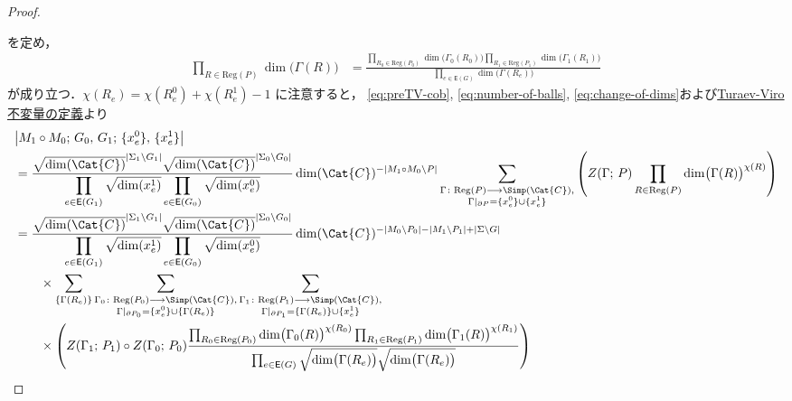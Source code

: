 \documentclass[TQFT_main]{subfiles}
\begin{document}
\begin{proof}
\begin{itemize}
    \end{itemize}
    を定め，
    \begin{align}
        \prod_{R \in \mathrm{Reg}(P)} \dim \bigl( \Gamma(R) \bigr) 
        &= \frac{\displaystyle\prod_{R_0 \in \mathrm{Reg}(P_0)} \dim \bigl( \Gamma_0(R_0) \bigr)  \prod_{R_1 \in \mathrm{Reg}(P_1)} \dim \bigl( \Gamma_1(R_1) \bigr) }{\displaystyle\prod_{e \in \mathsf{E}(G)} \dim \bigl( \Gamma (R_e) \bigr) } \label{eq:change-of-dims}
    \end{align}
    が成り立つ．$\chi (R_e) = \chi (R_e^0) + \chi (R_e^1) - 1$ に注意すると，
    \eqref{eq:preTV-cob}, \eqref{eq:number-of-balls}, \eqref{eq:change-of-dims}および\hyperref[def:TV-bdy]{Turaev-Viro不変量の定義}より
    \footnotesize
    \begin{align}
        &\abs{M_1 \circ M_0;\, G_0,\, G_1;\, \{x^0_e\},\, \{x^1_e\}} \\
        &= \frac{\sqrt{\dim(\Cat{C})}^{\abs{\Sigma_1 \setminus G_1}} \sqrt{\dim(\Cat{C})}^{\abs{\Sigma_0 \setminus G_0}}}{\displaystyle\prod_{e \in \mathsf{E} (G_1)} \sqrt{\dim (x^1_e)} \prod_{e \in \mathsf{E} (G_0)} \sqrt{\dim (x^0_e)}} \dim(\Cat{C})^{-\abs{M_1 \circ M_0 \setminus P}}
        \sum_{\substack{\Gamma \colon \mathrm{Reg}(P) \lto \Simp(\Cat{C}), \\ \Gamma|_{\partial P} = \{x^0_e\} \cup \{x^1_e\}}} \left(Z(\Gamma;\, P) \prod_{R \in \mathrm{Reg}(P)} \dim \bigl( \Gamma(R) \bigr)^{\chi(R)}\right) \\
        &= \frac{\sqrt{\dim(\Cat{C})}^{\abs{\Sigma_1 \setminus G_1}} \sqrt{\dim(\Cat{C})}^{\abs{\Sigma_0 \setminus G_0}}}{\displaystyle\prod_{e \in \mathsf{E} (G_1)} \sqrt{\dim (x^1_e)} \prod_{e \in \mathsf{E} (G_0)} \sqrt{\dim (x^0_e)}} \dim(\Cat{C})^{-\abs{M_0 \setminus P_0} - \abs{M_1 \setminus P_1} + \abs{\Sigma \setminus G}}  \\
        &\qquad \times \sum_{\{\Gamma(R_e)\}}\sum_{\substack{\Gamma_0 \colon \mathrm{Reg}(P_0) \lto \Simp(\Cat{C}), \\ \Gamma|_{\partial P_0} = \{x^0_e\} \cup \{\Gamma(R_e)\}}}  \sum_{\substack{\Gamma_1 \colon \mathrm{Reg}(P_1) \lto \Simp(\Cat{C}), \\ \Gamma|_{\partial P_1} =  \{\Gamma(R_e)\} \cup \{x^1_e\}}} \\
        &\qquad \times \left(Z(\Gamma_1;\, P_1) \circ Z(\Gamma_0;\, P_0) \frac{\prod_{R_0 \in \mathrm{Reg}(P_0)} \dim \bigl( \Gamma_0(R) \bigr)^{\chi(R_0)} \prod_{R_1 \in \mathrm{Reg}(P_1)} \dim \bigl( \Gamma_1(R) \bigr)^{\chi(R_1)}}{\prod_{e \in \mathsf{E}(G)} \sqrt{\dim \bigl( \Gamma(R_e) \bigr)} \sqrt{\dim \bigl( \Gamma(R_e) \bigr)}}\right) \\ 

\end{align}
\end{proof}
\end{document}
